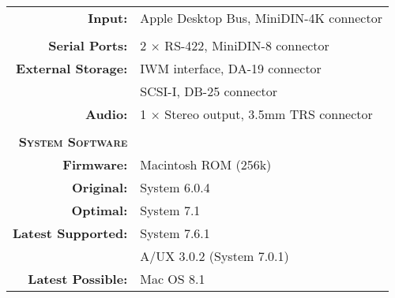 \begin{tabular}{ r p{6in} }
\\
\textbf{Input:} & Apple Desktop Bus, MiniDIN-4K connector \\
\\
\textbf{Serial Ports:} & 2 \(\times\) RS-422, MiniDIN-8 connector \\
\textbf{External Storage:} & IWM interface, DA-19 connector \\
~ & SCSI-I, DB-25 connector \\
\textbf{Audio:} & 1 \(\times\) Stereo output, 3.5mm TRS connector \\
\\
\textbf{\textsc{System Software}} & ~ \\
\textbf{Firmware:} & Macintosh ROM (256k) \\
\textbf{Original:} & System 6.0.4 \\
\textbf{Optimal:} & System 7.1 \\
\textbf{Latest Supported:} & System 7.6.1 \\
~ & A/UX 3.0.2 (System 7.0.1) \\
\textbf{Latest Possible:} & Mac OS 8.1 \\
\end{tabular}
